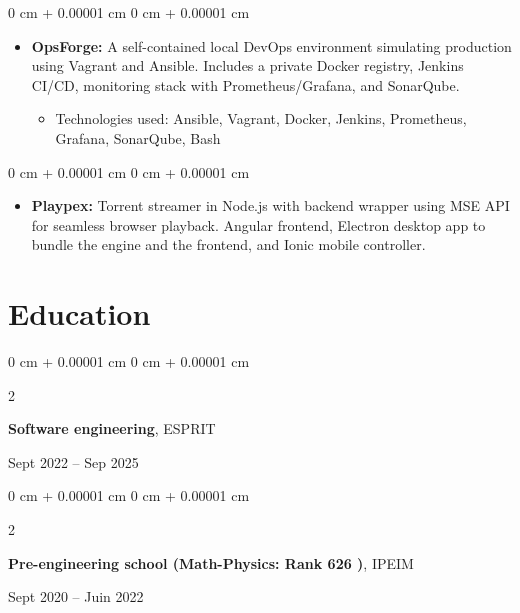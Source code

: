\documentclass[10pt, letterpaper]{article}
\newenvironment{highlights}{
  \begin{itemize}[
    topsep=0.10 cm,
    parsep=0.10 cm,
    partopsep=0pt,
    itemsep=0pt,
    leftmargin=0 cm + 10pt
    ]
  }{
\end{itemize}
}
\newenvironment{highlightsforbulletentries}{
  \begin{itemize}[
    topsep=0 cm,
    parsep=0.10 cm,
    partopsep=0pt,
    itemsep=0pt,
    leftmargin=10pt
    ]
  }{
\end{itemize}
} %
\newenvironment{onecolentry}{
  \begin{adjustwidth}{
      0 cm + 0.00001 cm
    }{
      0 cm + 0.00001 cm
    }
  }{
  \end{adjustwidth}
} %
\newenvironment{twocolentry}[2][]{
  \onecolentry
  \def\secondColumn{#2}
  \setcolumnwidth{\fill, 4.5 cm}
  \begin{paracol}{2}
  }{
    \switchcolumn \raggedleft \secondColumn
  \end{paracol}
  \end{onecolentry}
} %
\begin{document}
\begin{onecolentry}
  \begin{highlights}
  \item \textbf{OpsForge:} A self-contained local DevOps environment simulating production using Vagrant and Ansible. Includes a private Docker registry, Jenkins CI/CD, monitoring stack with Prometheus/Grafana, and SonarQube.
    \begin{highlightsforbulletentries}
    \item Technologies used: Ansible, Vagrant, Docker, Jenkins, Prometheus, Grafana, SonarQube, Bash
    \end{highlightsforbulletentries}
  \end{highlights}
\end{onecolentry}
\begin{onecolentry}
  \begin{highlights}
  \item \textbf{Playpex:} Torrent streamer in Node.js with backend wrapper using MSE API for seamless browser playback. Angular frontend, Electron desktop app to bundle the engine and the frontend, and Ionic mobile controller.
  \end{highlights}
\end{onecolentry}


  \section{Education}





  \begin{twocolentry}{
      Sept 2022 – Sep 2025
    }
    \textbf{Software engineering}, ESPRIT
  \end{twocolentry}

  \vspace{0.10 cm}

  \begin{twocolentry}{
      Sept 2020 – Juin 2022
    }
    \textbf{Pre-engineering school (Math-Physics: Rank 626 )}, IPEIM
  \end{twocolentry}




  
\end{document}
